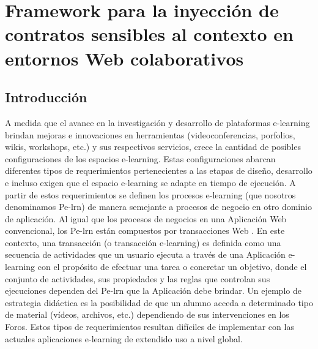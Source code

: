 
\chapter{Framework para la inyección de contratos sensibles al contexto en
entornos Web colaborativos} \label{cap:framework} \label{cap:6}



\section {Introducción} \label{intro}

A medida que el avance en la investigación y desarrollo de plataformas
e-learning brindan mejoras e innovaciones en herramientas
(videoconferencias, porfolios, wikis, workshops, etc.) y sus respectivos
servicios, crece la cantidad de posibles configuraciones de los espacios
e-learning. Estas configuraciones abarcan diferentes tipos de requerimientos
pertenecientes a las etapas de diseño, desarrollo e incluso exigen que el
espacio e-learning se adapte en tiempo de ejecución. A partir de estos
requerimientos se definen los procesos e-learning (que nosotros denominamos
Pe-lrn) \cite{tweb} de manera semejante a procesos de negocio en otro dominio de
aplicación. Al igual que los procesos de negocios en una Aplicación Web
convencional, los Pe-lrn están compuestos por transacciones Web \cite{}. En este
contexto, una transacción (o transacción e-learning) es definida como una
secuencia de actividades que un usuario ejecuta a través de una Aplicación
e-learning con el propósito de efectuar una tarea o concretar un objetivo, donde
el conjunto de actividades, sus propiedades y las reglas que controlan sus
ejecuciones dependen del Pe-lrn que la Aplicación debe brindar. Un ejemplo de
estrategia didáctica es la posibilidad de que un alumno acceda a determinado
tipo de material (vídeos, archivos, etc.)  dependiendo de sus intervenciones en
los Foros. Estos tipos de requerimientos resultan difíciles de implementar con
las actuales aplicaciones e-learning de extendido uso a nivel global. 

